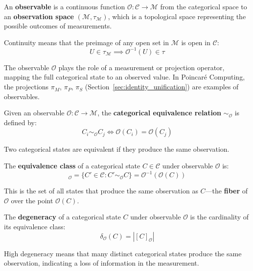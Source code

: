 \begin{definition}
\label{def:observable_formal}
An \textbf{observable} is a continuous function $\mathcal{O}: \mathcal{C} \to \mathcal{M}$ from the categorical space to an \textbf{observation space} $(\mathcal{M}, \tau_{\mathcal{M}})$, which is a topological space representing the possible outcomes of measurements.

Continuity means that the preimage of any open set in $\mathcal{M}$ is open in $\mathcal{C}$:
\begin{equation}
U \in \tau_{\mathcal{M}} \implies \mathcal{O}^{-1}(U) \in \tau
\end{equation}
\end{definition}

The observable $\mathcal{O}$ plays the role of a measurement or projection operator, mapping the full categorical state to an observed value. In Poincaré Computing, the projections $\pi_M$, $\pi_P$, $\pi_S$ (Section~\ref{sec:identity_unification}) are examples of observables.

\begin{definition}
\label{def:equivalence_relation_formal}
Given an observable $\mathcal{O}: \mathcal{C} \to \mathcal{M}$, the \textbf{categorical equivalence relation} $\sim_{\mathcal{O}}$ is defined by:
\begin{equation}
C_i \sim_{\mathcal{O}} C_j \iff \mathcal{O}(C_i) = \mathcal{O}(C_j)
\label{eq:equivalence_relation}
\end{equation}

Two categorical states are equivalent if they produce the same observation.
\end{definition}

\begin{definition}
\label{def:equivalence_class_formal}
The \textbf{equivalence class} of a categorical state $C \in \mathcal{C}$ under observable $\mathcal{O}$ is:
\begin{equation}
[C]_{\mathcal{O}} = \{C' \in \mathcal{C} : C' \sim_{\mathcal{O}} C\} = \mathcal{O}^{-1}(\mathcal{O}(C))
\label{eq:equivalence_class}
\end{equation}

This is the set of all states that produce the same observation as $C$—the \textbf{fiber} of $\mathcal{O}$ over the point $\mathcal{O}(C)$.
\end{definition}

\begin{definition}[Degeneracy]
\label{def:degeneracy_formal}
The \textbf{degeneracy} of a categorical state $C$ under observable $\mathcal{O}$ is the cardinality of its equivalence class:
\begin{equation}
\delta_{\mathcal{O}}(C) = |[C]_{\mathcal{O}}|
\label{eq:degeneracy}
\end{equation}

High degeneracy means that many distinct categorical states produce the same observation, indicating a loss of information in the measurement.
\end{definition}

